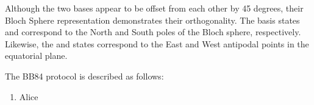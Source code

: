 \documentclass[conference]{IEEEtran}
\begin{document}
Although the two bases appear to be offset from each other by 45 degrees, their Bloch Sphere representation demonstrates their orthogonality. The basis states \ket{\uparrow} and \ket{\downarrow} correspond to the North and South poles of the Bloch sphere, respectively. Likewise, the \ket{\nwarrow} and \ket{\nearrow} states correspond to the East and West antipodal points in the equatorial plane\cite{Williams}.

The BB84 protocol is described as follows:
\begin{enumerate}
  \item Alice
%
%



%
%



\end{enumerate}
\end{document}

